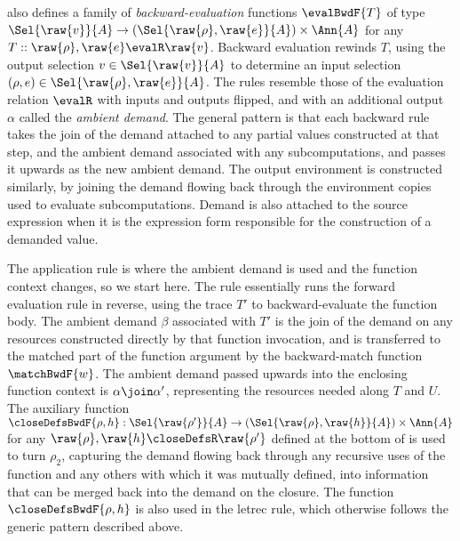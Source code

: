  also defines a family of \emph{backward-evaluation} functions $\evalBwdF{T}$ of type $\Sel{\raw{v}}{A} \to (\Sel{\raw{\rho}, \raw{e}}{A}) \times \Ann{A}$ for any $T :: \raw{\rho}, \raw{e} \evalR \raw{v}$. Backward evaluation rewinds $T$, using the output selection $v \in \Sel{\raw{v}}{A}$ to determine an input selection $(\rho, e) \in \Sel{\raw{\rho}, \raw{e}}{A}$. The rules resemble those of the evaluation relation $\evalR$ with inputs and outputs flipped, and with an additional output $\alpha$ called the \emph{ambient demand}. The general pattern is that each backward rule takes the join of the demand attached to any partial values constructed at that step, and the ambient demand associated with any subcomputations, and passes it upwards as the new ambient demand. The output environment is constructed similarly, by joining the demand flowing back through the environment copies used to evaluate subcomputations. Demand is also attached to the source expression when it is the expression form responsible for the construction of a demanded value.

 The application rule is where the ambient demand is used and the function context changes, so we start here. The rule essentially runs the forward evaluation rule in reverse, using the trace $T'$ to backward-evaluate the function body. The ambient demand $\beta$ associated with $T'$ is the join of the demand on any resources constructed directly by that function invocation, and is transferred to the matched part of the function argument by the backward-match function $\matchBwdF{w}$. The ambient demand passed upwards into the enclosing function context is $\alpha \join \alpha'$, representing the resources needed along $T$ and $U$. The auxiliary function $\smash{\closeDefsBwdF{\rho, h}}: \smash{\Sel{\raw{\rho'}}{A} \to (\Sel{\raw{\rho}, \raw{h}}{A})} \times \Ann{A}$ for any $\raw{\rho}, \raw{h} \closeDefsR \raw{\rho'}$ defined at the bottom of  is used to turn $\rho_2$, capturing the demand flowing back through any recursive uses of the function and any others with which it was mutually defined, into information that can be merged back into the demand on the closure. The function $\closeDefsBwdF{\rho,h}$ is also used in the letrec rule, which otherwise follows the generic pattern described above.

